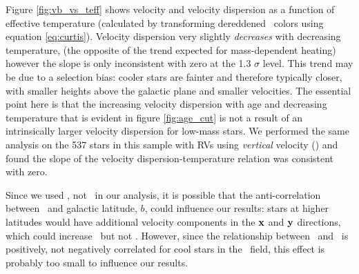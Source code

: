 Figure \ref{fig:vb_vs_teff} shows velocity and velocity dispersion
as a function of effective temperature (calculated by transforming dereddened
\gaia\ colors using equation \ref{eq:curtis}).
Velocity dispersion very slightly {\it decreases} with decreasing temperature,
(the opposite of the trend expected for mass-dependent heating) however the
slope is only inconsistent with zero at the 1.3 $\sigma$ level.
This trend may be due to a selection bias: cooler stars are fainter and
therefore typically closer, with smaller heights above the galactic plane and
smaller velocities.
The essential point here is that the increasing velocity dispersion with age
and decreasing temperature that is evident in figure \ref{fig:age_cut} is not
a result of an intrinsically larger velocity dispersion for low-mass stars.
We performed the same analysis on the 537 stars in this sample with RVs using
{\it vertical} velocity (\vz) and found the slope of the velocity
dispersion-temperature relation was consistent with zero.

Since we used \vb, not \vz\ in our analysis, it is possible that the
anti-correlation between \teff\ and galactic latitude, $b$, could influence
our results: stars at higher latitudes would have additional velocity
components in the ${\bf x}$ and ${\bf y}$ directions, which could increase
\vb\ but not \vz.
However, since the relationship between \sigmavb\ and \teff\ is positively,
not negatively correlated for cool stars in the \kepler\ field, this effect is
probably too small to influence our results.

